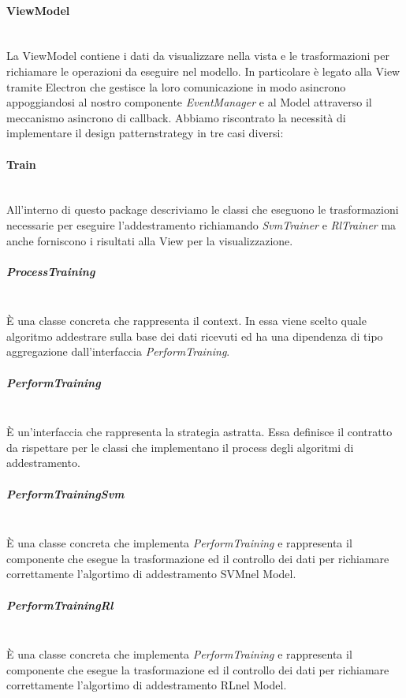 		\paragraph{ViewModel} \mbox{} \\[1mm]
		La ViewModel contiene i dati da visualizzare nella vista e le trasformazioni per richiamare le operazioni da eseguire nel modello.
		In particolare è legato alla View tramite Electron che gestisce la loro comunicazione in modo asincrono appoggiandosi al nostro componente \textit{EventManager} e al Model attraverso il meccanismo asincrono di callback.
		Abbiamo riscontrato la necessità di implementare il design pattern\glosp strategy in tre casi diversi:
		\paragraph*{Train} \mbox{} \\[1mm]
		All'interno di questo package descriviamo le classi che eseguono le trasformazioni necessarie per eseguire l'addestramento richiamando \textit{SvmTrainer} e \textit{RlTrainer} ma anche forniscono i risultati alla View per la visualizzazione.
		\subparagraph*{ProcessTraining} \mbox{} \\[1mm]
		È una classe concreta che rappresenta il context. In essa viene scelto quale algoritmo addestrare sulla base dei dati ricevuti ed ha una dipendenza di tipo aggregazione dall'interfaccia \textit{PerformTraining}.
		\subparagraph*{PerformTraining} \mbox{} \\[1mm]
		È un'interfaccia che rappresenta la strategia astratta. Essa definisce il contratto da rispettare per le classi che implementano il process degli algoritmi di addestramento.
		\subparagraph*{PerformTrainingSvm} \mbox{} \\[1mm]
		È una classe concreta che implementa \textit{PerformTraining} e rappresenta il componente che esegue la trasformazione ed il controllo dei dati per richiamare correttamente l'algortimo di addestramento SVM\glosp nel Model.
		\subparagraph*{PerformTrainingRl} \mbox{} \\[1mm]
		È una classe concreta che implementa \textit{PerformTraining} e rappresenta il componente che esegue la trasformazione ed il controllo dei dati per richiamare correttamente l'algortimo di addestramento RL\glosp nel Model.
		\mbox{}

